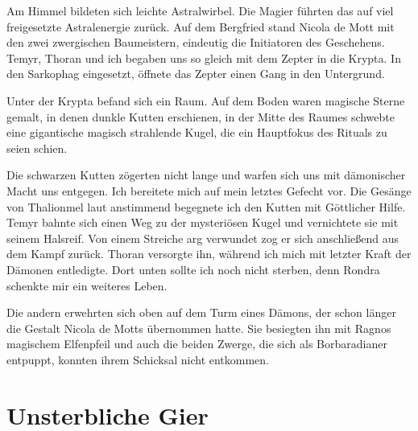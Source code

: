 Am Himmel bildeten sich leichte Astralwirbel. Die Magier führten das auf viel freigesetzte Astralenergie zurück. Auf dem Bergfried stand Nicola de Mott mit den zwei zwergischen Baumeistern, eindeutig die Initiatoren des Geschehens. Temyr, Thoran und ich begaben uns so gleich mit dem Zepter in die Krypta. In den Sarkophag eingesetzt, öffnete das Zepter einen Gang in den Untergrund.\par
Unter der Krypta befand sich ein Raum. Auf dem Boden waren magische Sterne gemalt, in denen dunkle Kutten erschienen, in der Mitte des Raumes schwebte eine gigantische magisch strahlende Kugel, die ein Hauptfokus des Rituals zu seien schien.\par
Die schwarzen Kutten zögerten nicht lange und warfen sich uns mit dämonischer Macht uns entgegen. Ich bereitete mich auf mein letztes Gefecht vor. Die Gesänge von Thalionmel laut anstimmend begegnete ich den Kutten mit Göttlicher Hilfe. Temyr bahnte sich einen Weg zu der mysteriösen Kugel und vernichtete sie mit seinem Halsreif. Von einem Streiche arg verwundet zog er sich anschließend aus dem Kampf zurück. Thoran versorgte ihn, während ich mich mit letzter Kraft der Dämonen entledigte. Dort unten sollte ich noch nicht sterben, denn Rondra schenkte mir ein weiteres Leben.\par
Die andern erwehrten sich oben auf dem Turm eines Dämons, der schon länger die Gestalt Nicola de Motts übernommen hatte. Sie besiegten ihn mit Ragnos magischem Elfenpfeil und auch die beiden Zwerge, die sich als Borbaradianer entpuppt, konnten ihrem Schicksal nicht entkommen. \par


\chapter{Unsterbliche Gier}

